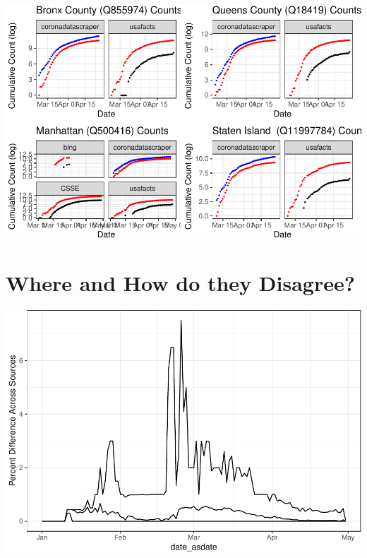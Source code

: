 \documentclass[
]{book}
\begin{document}
\begin{center}\includegraphics[width=1\linewidth]{HowToBeCarefulWithCovid19Counts_files/figure-latex/unnamed-chunk-29-1} \end{center}

\hypertarget{where-and-how-do-they-disagree}{%
\section{Where and How do they Disagree?}\label{where-and-how-do-they-disagree}}

\begin{center}\includegraphics[width=1\linewidth]{HowToBeCarefulWithCovid19Counts_files/figure-latex/unnamed-chunk-31-1} \end{center}

\hypertarget{htmlwidget-4368d015673f21693685}{}
\end{document}
